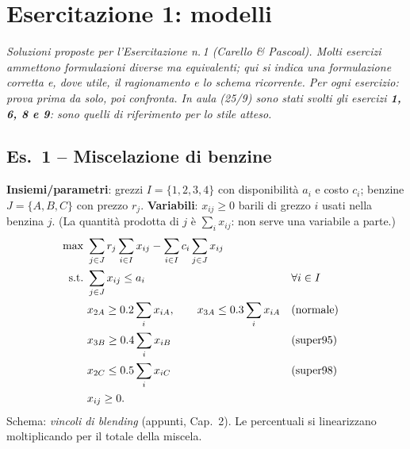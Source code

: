 \chapter{Esercitazione 1: modelli}\label{cap:es1}

\emph{Soluzioni proposte per l'Esercitazione n.\,1 (Carello \& Pascoal). Molti esercizi ammettono formulazioni diverse ma equivalenti; qui si indica una formulazione corretta e, dove utile, il ragionamento e lo schema ricorrente. Per ogni esercizio: prova prima da solo, poi confronta. In aula (25/9) sono stati svolti gli esercizi \textbf{1, 6, 8 e 9}: sono quelli di riferimento per lo stile atteso.}

\section*{Es.\ 1 -- Miscelazione di benzine}
\textbf{Insiemi/parametri}: grezzi $I=\{1,2,3,4\}$ con disponibilità $a_i$ e costo $c_i$; benzine $J=\{A,B,C\}$ con prezzo $r_j$.
\textbf{Variabili}: $x_{ij}\ge0$ barili di grezzo $i$ usati nella benzina $j$. (La quantità prodotta di $j$ è $\sum_ix_{ij}$: non serve una variabile a parte.)
\begin{align*}
\max\ & \sum_{j\in J}r_j\sum_{i\in I}x_{ij}-\sum_{i\in I}c_i\sum_{j\in J}x_{ij}\\
\text{s.t.}\ & \sum_{j\in J}x_{ij}\le a_i && \forall i\in I\\
& x_{2A}\ge0.2\sum_{i}x_{iA},\qquad x_{3A}\le0.3\sum_ix_{iA} &&\text{(normale)}\\
& x_{3B}\ge0.4\sum_ix_{iB} &&\text{(super95)}\\
& x_{2C}\le0.5\sum_ix_{iC} &&\text{(super98)}\\
& x_{ij}\ge0.
\end{align*}
Schema: \emph{vincoli di blending} (appunti, Cap.~2). Le percentuali si linearizzano moltiplicando per il totale della miscela.

